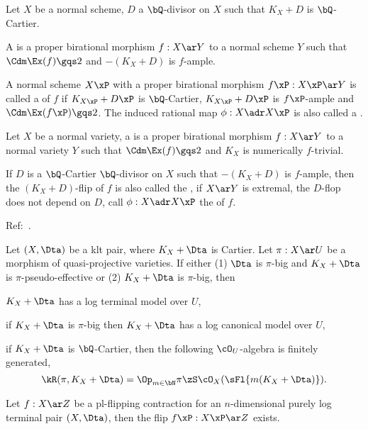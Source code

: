 \documentclass[article, a4paper, twoside]{universal}
\begin{document}
\begin{dfn}[Flip, 3.33]
	Let $X$ be a normal scheme, $D$ a $\bQ$-divisor on $X$ such that $K_{X}+D$ is $\bQ$-Cartier.

	A  is a proper birational morphism $f:X\ar Y$ to a normal scheme $Y$ such that $\Cdm\Ex(f)\gqs2$ and $-(K_{X}+D)$ is $f$-ample.

	A normal scheme $X\xP$ with a proper birational morphism $f\xP:X\xP\ar Y$ is called a  of $f$ if $K_{X\xP}+D\xP$ is $\bQ$-Cartier, $K_{X\xP}+D\xP$ is $f\xP$-ample and $\Cdm\Ex(f\xP)\gqs2$. The induced rational map $\phi:X\adr X\xP$ is also called a .
\end{dfn}

\begin{dfn}[Flop, 6.10]
	Let $X$ be a normal variety, a  is a proper birational morphism $f:X\ar Y$ to a normal variety $Y$ such that $\Cdm\Ex(f)\gqs2$ and $K_{X}$ is numerically $f$-trivial.

	If $D$ is a $\bQ$-Cartier $\bQ$-divisor on $X$ such that $-(K_{X}+D)$ is $f$-ample, then the $(K_{X}+D)$-flip of $f$ is also called the , if $X\ar Y$ is extremal, the $D$-flop does not depend on $D$, call $\phi:X\adr X\xP$ the  of $f$.
\end{dfn}

Ref:~\cite{BCHM2010}.

\begin{thm}
	Let $(X,\Dta)$ be a klt pair, where $K_{X}+\Dta$ is Cartier. Let $\pi:X\ar U$ be a morphism of quasi-projective varieties. If either (1) $\Dta$ is $\pi$-big and $K_{X}+\Dta$ is $\pi$-pseudo-effective or (2) $K_{X}+\Dta$ is $\pi$-big, then
	\begin{itm}
		\item $K_{X}+\Dta$ has a log terminal model over $U$,
		\item if $K_{X}+\Dta$ is $\pi$-big then $K_{X}+\Dta$ has a log canonical model over $U$,
		\item if $K_{X}+\Dta$ is $\bQ$-Cartier, then the following $\cO_{U}$-algebra is finitely generated,
		\[
			\kR(\pi,K_{X}+\Dta)=\Op_{m\in\bN}\pi\zS\cO_{X}(\sFl{m(K_{X}+\Dta)}).
		\]
	\end{itm}
\end{thm}


\begin{thm}[$A_{n}$]
	Let $f:X\ar Z$ be a pl-flipping contraction for an $n$-dimensional purely log terminal pair $(X,\Dta)$, then the flip $f\xP:X\xP\ar Z$ exists.
\end{thm}
\end{document}
